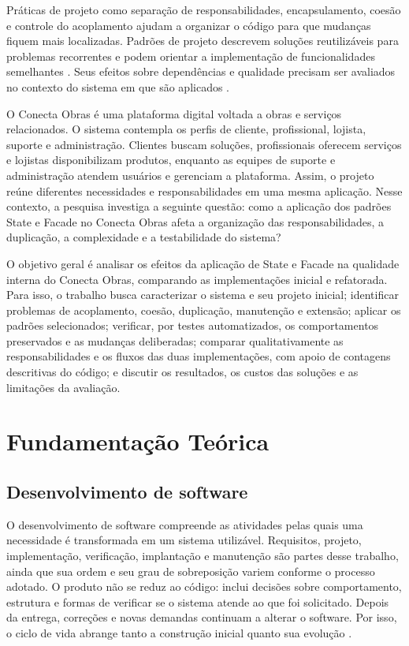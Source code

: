 \documentclass[12pt]{article}
\begin{document}
Práticas de projeto como separação de responsabilidades, encapsulamento, coesão e controle do acoplamento ajudam a organizar o código para que mudanças fiquem mais localizadas. Padrões de projeto descrevem soluções reutilizáveis para problemas recorrentes e podem orientar a implementação de funcionalidades semelhantes \cite{alhawari2022}. Seus efeitos sobre dependências e qualidade precisam ser avaliados no contexto do sistema em que são aplicados \cite{hsu2024}.

O Conecta Obras é uma plataforma digital voltada a obras e serviços relacionados. O sistema contempla os perfis de cliente, profissional, lojista, suporte e administração. Clientes buscam soluções, profissionais oferecem serviços e lojistas disponibilizam produtos, enquanto as equipes de suporte e administração atendem usuários e gerenciam a plataforma. Assim, o projeto reúne diferentes necessidades e responsabilidades em uma mesma aplicação. Nesse contexto, a pesquisa investiga a seguinte questão: como a aplicação dos padrões State e Facade no Conecta Obras afeta a organização das responsabilidades, a duplicação, a complexidade e a testabilidade do sistema?

O objetivo geral é analisar os efeitos da aplicação de State e Facade na qualidade interna do Conecta Obras, comparando as implementações inicial e refatorada. Para isso, o trabalho busca caracterizar o sistema e seu projeto inicial; identificar problemas de acoplamento, coesão, duplicação, manutenção e extensão; aplicar os padrões selecionados; verificar, por testes automatizados, os comportamentos preservados e as mudanças deliberadas; comparar qualitativamente as responsabilidades e os fluxos das duas implementações, com apoio de contagens descritivas do código; e discutir os resultados, os custos das soluções e as limitações da avaliação.




\section{Fundamentação Teórica}

\subsection{Desenvolvimento de software}

O desenvolvimento de software compreende as atividades pelas quais uma necessidade é transformada em um sistema utilizável. Requisitos, projeto, implementação, verificação, implantação e manutenção são partes desse trabalho, ainda que sua ordem e seu grau de sobreposição variem conforme o processo adotado. O produto não se reduz ao código: inclui decisões sobre comportamento, estrutura e formas de verificar se o sistema atende ao que foi solicitado. Depois da entrega, correções e novas demandas continuam a alterar o software. Por isso, o ciclo de vida abrange tanto a construção inicial quanto sua evolução \cite{hsu2024}.
\end{document}
